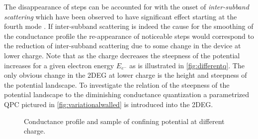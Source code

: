 The disappearance of steps can be accounted for with the onset of \emph{inter-subband scattering} which have been observed to have significant effect starting at the fourth mode \cite{Lehmann2011}. If inter-subband scattering is indeed the cause for the smoothing of the conductance profile the re-appearance of noticeable steps would correspond to the reduction of inter-subband scattering due to some change in the device at lower charge.
Note that as the charge decreases the steepness of the potential increases for a given electron energy $E_{e^-}$ as is illustrated in \cref{fig:differentq}.
The only obvious change in the 2DEG at lower charge is the height and steepness of the potential landscape. To investigate the relation of the steepness of the potential landscape to the diminishing conductance quantization a parametrized  QPC pictured in \cref{fig:variationalwalled} is introduced into the 2DEG.
\begin{figure}[h] 
\centering
{}
\caption{Conductance profile and sample of confining potential at different charge.}\label{fig:pointtrans}
\end{figure}
\FloatBarrier
